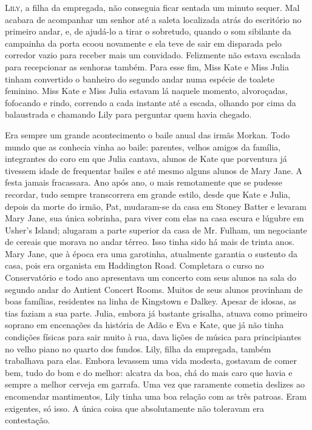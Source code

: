 \textsc{Lily,} a filha da empregada, não conseguia ficar sentada um minuto
sequer. Mal acabara de acompanhar um senhor até a saleta localizada
atrás do escritório no primeiro andar, e, de ajudá-lo a tirar o
sobretudo, quando o som sibilante da campainha da porta ecoou
novamente e ela teve de sair em disparada pelo corredor vazio para
receber mais um convidado. Felizmente não estava escalada para
recepcionar as senhoras também. Para esse fim, Miss Kate e Miss Julia
tinham convertido o banheiro do segundo andar numa espécie de toalete
feminino. Miss Kate e Miss Julia estavam lá naquele momento,
alvoroçadas, fofocando e rindo, correndo a cada instante até a escada,
olhando por cima da balaustrada e chamando Lily para perguntar quem
havia chegado.

Era sempre um grande acontecimento o baile anual das irmãs Morkan.
Todo mundo que as conhecia vinha ao baile: parentes, velhos amigos da
família, integrantes do coro em que Julia cantava, alunos de Kate
que porventura já tivessem idade de frequentar bailes e até mesmo
alguns alunos de Mary Jane. A festa jamais fracassara. Ano após ano, o
mais remotamente que se pudesse recordar, tudo sempre transcorrera em
grande estilo, desde que Kate e Julia, depois da morte do irmão, Pat,
mudaram-se da casa
em Stoney Batter e levaram Mary Jane, sua única sobrinha, para viver
com elas na casa escura e lúgubre em Usher's Island; alugaram a
parte superior da casa de Mr. Fulham, um negociante de cereais que
morava no andar térreo. Isso tinha sido há mais de trinta anos. Mary
Jane, que à época era uma garotinha, atualmente garantia o sustento da
casa, pois era organista em Haddington Road. Completara o curso no
Conservatório e todo ano apresentava um concerto com seus alunos na
sala do segundo andar do Antient Concert Rooms. Muitos de seus alunos
provinham de boas famílias, residentes na linha de Kingstown e Dalkey.
Apesar de idosas, as tias faziam a sua parte. Julia, embora já
bastante grisalha, atuava como primeiro soprano em encenações da
história de Adão e Eva e Kate, que já não tinha condições físicas
para sair muito à rua, dava lições de música para principiantes no
velho piano no quarto dos fundos. Lily, filha da empregada, também
trabalhava para elas. Embora levassem uma vida modesta, gostavam de
comer bem, tudo do bom e do melhor: alcatra da boa, chá do mais caro
que havia e sempre a melhor cerveja em garrafa. Uma vez que raramente
cometia deslizes ao encomendar mantimentos, Lily tinha uma boa relação
com as três patroas. Eram exigentes, só isso. A única coisa que
absolutamente não toleravam era contestação.

